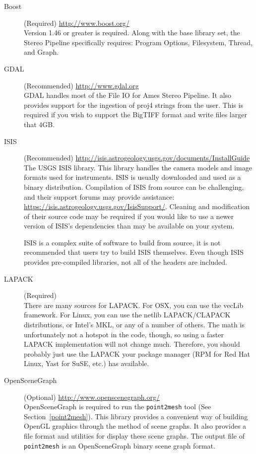 \begin{description}
\item [{Boost}] (Required) \url{http://www.boost.org/}\\
Version 1.46 or greater is required. Along with the base library
set, the Stereo Pipeline specifically requires: Program Options, Filesystem,
Thread, and Graph.

\item [{GDAL}] (Recommended) \url{http://www.gdal.org}\\
GDAL handles most of the File IO for Ames Stereo Pipeline. It also
provides support for the ingestion of proj4 strings from the
user. This is required if you wish to support the BigTIFF format and
write files larger that 4GB.

\item [{ISIS}] (Recommended) \url{http://isis.astrogeology.usgs.gov/documents/InstallGuide}\\
The \ac{USGS} \acf{ISIS} library. This library handles the camera
models and image formats used for instruments.  \ac{ISIS} is usually
downloaded and used as a binary distribution.  Compilation of
\ac{ISIS} from source can be challenging, and their support forums may
provide assistance:
\url{https://isis.astrogeology.usgs.gov/IsisSupport/}. Cleaning and
modification of their source code may be required if you would like to
use a newer version of ISIS's dependencies than may be available 
on your system.

ISIS is a complex suite of software to build from source, it is not
recommended that users try to build ISIS themselves.  Even though ISIS
provides pre-compiled libraries, not all of the headers are included.

\item [{LAPACK}] (Required)\\
There are many sources for LAPACK\@. For OSX, you can use the
vecLib framework. For Linux, you can use the netlib LAPACK/CLAPACK
distributions, or Intel's MKL, or any of a number of others. The math
is unfortunately not a hotspot in the code, though, so using a faster
LAPACK implementation will not change much. Therefore, you should
probably just use the LAPACK your package manager (RPM for Red Hat
Linux, Yast for SuSE, etc.) has available.

\item [{OpenSceneGraph}] (Optional) \url{http://www.openscenegraph.org/}\\
OpenSceneGraph is required to run the \texttt{point2mesh} tool (See
Section~\ref{point2mesh}). This library provides a convenient way of
building OpenGL graphics through the method of scene graphs. It also
provides a file format and utilities for display these scene
graphs. The output file of \texttt{point2mesh} is an OpenSceneGraph
binary scene graph format.


\end{description}
